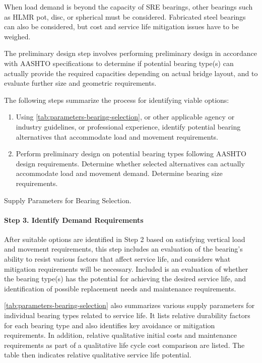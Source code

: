 When load demand is beyond the capacity of SRE bearings, other bearings such as HLMR pot, disc, or spherical must be considered. Fabricated steel bearings can also be considered, but cost and service life mitigation issues have to be weighed.

The preliminary design step involves performing preliminary design in accordance with AASHTO specifications to determine if potential bearing type(s) can actually provide the required capacities depending on actual bridge layout, and to evaluate further size and geometric requirements.

The following steps summarize the process for identifying viable options:
\begin{enumerate}[label=步骤 2.\arabic*,itemindent=4em]
  \item Using \cref{tab:parameters-bearing-selection}, or other applicable agency or industry guidelines, or professional experience, identify potential bearing alternatives that accommodate load and movement requirements.
  \item Perform preliminary design on potential bearing types following AASHTO design requirements. Determine whether selected alternatives can actually accommodate load and movement demand. Determine bearing size requirements.
\end{enumerate}

\begin{table}
  \caption{Supply Parameters for Bearing Selection.}
  \label{tab:parameters-bearing-selection}
\end{table}

\paragraph*{Step 3. Identify Demand Requirements}
After suitable options are identified in Step 2 based on satisfying vertical load and movement requirements, this step includes an evaluation of the bearing’s ability to resist various factors that affect service life, and considers what mitigation requirements will be necessary. Included is an evaluation of whether the bearing type(s) has the potential for achieving the desired service life, and identification of possible replacement needs and maintenance requirements.

\cref{tab:parameters-bearing-selection} also summarizes various supply parameters for individual bearing types related to service life. It lists relative durability factors for each bearing type and also identifies key avoidance or mitigation requirements. In addition, relative qualitative initial costs and maintenance requirements as part of a qualitative life cycle cost comparison are listed. The table then indicates relative qualitative service life potential.

